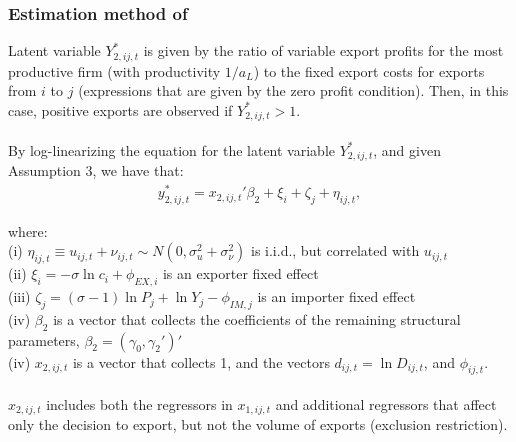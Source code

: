   \begin{frame}
    \frametitle{Estimation method of \cite{helpman2008estimating}}
    Latent variable $Y_{2,ij,t}^*$ is given by the ratio of variable export profits for the most productive firm (with productivity $1/a_L$) to the fixed export costs for exports from $i$ to $j$ (expressions that are given by the zero profit condition). Then, in this case, positive exports are observed if $Y_{2,ij,t}^* > 1$.\\~\\
    
    By log-linearizing the equation for the latent variable $Y_{2,ij,t}^*$, and given Assumption 3, we have that:
\begin{align}
    y_{2,i j,t}^*= x_{2,ij,t}'\beta_2 +\xi_{i}+\zeta_{j} +\eta_{i j,t},
    \label{eq:est_MHR_sampleselection}
\end{align}

\noindent where: \\
(i) $\eta_{ij,t} \equiv u_{ij,t} + \nu_{ij,t} \sim N(0, \sigma_u^2 + \sigma_\nu^2)$ is i.i.d., but correlated with $u_{ij,t}$ \\
 (ii) $\xi_{i}=-\sigma \ln c_{i}+\phi_{E X, i}$ is an exporter fixed effect \\
 (iii) $\zeta_{j}=(\sigma-1) \ln P_{j}+ \ln Y_{j}-\phi_{I M, j}$ is an importer fixed effect\\
  (iv) $\beta_2$ is a vector that collects the coefficients of the remaining structural parameters, $\beta_2 = (\gamma_0, \gamma_2')'$ \\
   (iv) $x_{2,ij,t}$ is a vector that collects 1, and the vectors $ d_{ij,t} = \ln D_{ij,t}$, and $\phi_{ij,t}$.
   \\~\\
    $x_{2,ij,t}$ includes both the regressors in $x_{1,ij,t}$ and additional regressors that affect only the decision to export, but not the volume of exports (exclusion restriction). 
  \end{frame}